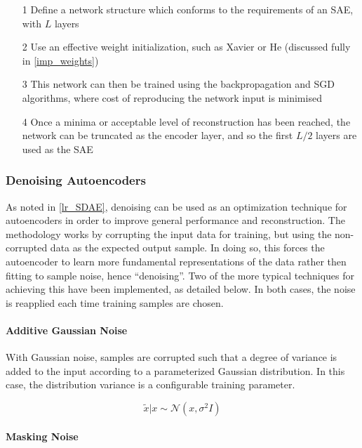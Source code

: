 \documentclass[a4paper,11pt,oneside]{article}
\theoremstyle{plain}
\theoremstyle{definition}
\begin{document}
	\begin{itemize}
		\item [1] Define a network structure which conforms to the requirements of an SAE, with $L$ layers
		\item [2] Use an effective weight initialization, such as Xavier or He (discussed fully in \ref{imp_weights})
		\item [3] This network can then be trained using the backpropagation and SGD algorithms, where cost of reproducing the network input is minimised
		\item [4] Once a minima or acceptable level of reconstruction has been reached, the network can be truncated as the encoder layer, and so the first $L/2$ layers are used as the SAE
	\end{itemize}
	
	\subsubsection{Denoising Autoencoders}\label{imp_denoising}
	
	As noted in \ref{lr_SDAE}, denoising can be used as an optimization technique for autoencoders in order to improve general performance and reconstruction. The methodology works by corrupting the input data for training, but using the non-corrupted data as the expected output sample. In doing so, this forces the autoencoder to learn more fundamental representations of the data rather then fitting to sample noise, hence ``denoising''. Two of the more typical techniques for achieving this have been implemented, as detailed below. In both cases, the noise is reapplied each time training samples are chosen.
	
	\paragraph{Additive Gaussian Noise}
	
	With Gaussian noise, samples are corrupted such that a degree of variance is added to the input according to a parameterized Gaussian distribution. In this case, the distribution variance is a configurable training parameter.
	
	\begin{equation}
	\tilde{{x}} | {x} \sim \mathcal{N}\left({x}, \sigma^{2} I\right)
	\end{equation}
	
	\paragraph{Masking Noise}
	
\end{document}
